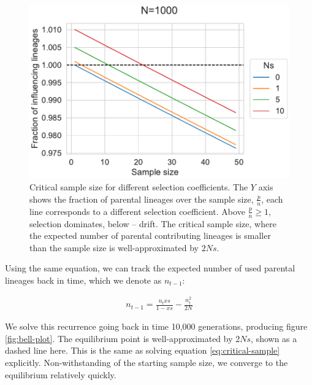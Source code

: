 \documentclass[review]{elsarticle}
\begin{document}
\begin{figure}
  \centering
  \includegraphics{fig/critical_sample_size.pdf}
  \caption{Critical sample size for different selection coefficients. The $Y$ axis shows the
    fraction of parental lineages over the sample size, $\frac{p}{n}$, each line corresponds to a
    different selection coefficient. Above $\frac{p}{n}\ge 1$, selection dominates, below -- drift.
    The critical sample size, where the expected number of parental contributing lineages is smaller
    than the sample size is well-approximated by $2Ns$.}
  \label{fig:critical-sample-size}
\end{figure}


Using the same equation, we can track the expected number of used parental lineages back in time,
which we denote as $n_{t-1}$:

\begin{align}
  \label{eq:contributors-back}
  n_{t-1}=\frac{n_txs}{1-xs} - \frac{n_t^2}{2N}
\end{align}

We solve this recurrence going back in time 10,000 generations, producing figure
\ref{fig:bell-plot}. The equilibrium point is well-approximated by $2Ns$, shown as a dashed line
here. This is the same as solving equation \ref{eq:critical-sample} explicitly. Non-withstanding of
the starting sample size, we converge to the equilibrium relatively quickly.
\end{document}
